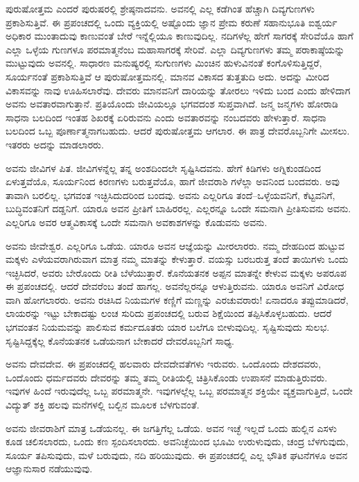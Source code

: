ಪುರುಷೋತ್ತಮ ಎಂದರೆ ಪುರುಷರಲ್ಲಿ ಶ್ರೇಷ್ಠನಾದವನು. ಅವನಲ್ಲಿ ಎಲ್ಲ ಕಡೆಗಿಂತ ಹೆಚ್ಚಾಗಿ ದಿವ್ಯಗುಣಗಳು ಪ್ರಕಾಶಿಸುತ್ತಿವೆ. ಈ ಪ್ರಪಂಚದಲ್ಲಿ ಒಂದು ವ್ಯಕ್ತಿಯಲ್ಲಿ ಅಷ್ಟೊಂದು ಜ್ಞಾನ ಪ್ರೇಮ ಕರುಣೆ ಸಹಾನುಭೂತಿ ಐಶ್ವರ್ಯ ಅಧಿಕಾರ ಮುಂತಾದುವು ಕಾಣುವಂತೆ ಬೇರೆ ಇನ್ನೆಲ್ಲಿಯೂ ಕಾಣುವುದಿಲ್ಲ. ನದಿಗಳೆಲ್ಲ ಹೇಗೆ ಸಾಗರಕ್ಕೆ ಸೇರಿವೆಯೊ ಹಾಗೆ ಎಲ್ಲಾ ಒಳ್ಳೆಯ ಗುಣಗಳೂ ಪರಮಾತ್ಮನೆಂಬ ಮಹಾಸಾಗರಕ್ಕೆ ಸೇರಿವೆ. ಎಲ್ಲಾ ದಿವ್ಯಗುಣಗಳು ತಮ್ಮ ಪರಾಕಾಷ್ಠೆಯನ್ನು ಮುಟ್ಟುವುದು ಅವನಲ್ಲಿ. ಸಾಧಾರಣ ಮನುಷ್ಯರಲ್ಲಿ ಸುಗುಣಗಳು ಮಿಂಚಿನ ಹುಳುವಿನಂತೆ ಕಂಗೊಳಿಸುತ್ತಿದ್ದರೆ, ಸೂರ್ಯನಂತೆ ಪ್ರಕಾಶಿಸುತ್ತಿವೆ ಆ ಪುರುಷೋತ್ತಮನಲ್ಲಿ. ಮಾನವ ವಿಕಾಸದ ತುತ್ತತುದಿ ಅದು. ಅದನ್ನು ಮೀರಿದ ವಿಕಾಸವನ್ನು ನಾವು ಊಹಿಸಲಾರೆವು. ದೇವರು ಮಾನವನಿಗೆ ದಾರಿಯನ್ನು ತೋರಲು ಇಳಿದು ಬಂದ ಎಂದು ಹೇಳಿದಾಗ ಅವನು ಅವತಾರವಾಗುತ್ತಾನೆ. ಪ್ರತಿಯೊಂದು ಜೀವಿಯಲ್ಲೂ ಭಗವದಂಶ ಸುಪ್ತವಾಗಿದೆ. ಜನ್ಮ ಜನ್ಮಗಳು ಹೋರಾಡಿ ಸಾಧನಾ ಬಲದಿಂದ ಇಂತಹ ಶಿಖರಕ್ಕೆ ಏರಿರುವನು ಎಂದು ಅವತಾರವನ್ನು ನಂಬದವರು ಹೇಳುತ್ತಾರೆ. ಸಾಧನಾ ಬಲದಿಂದ ಒಬ್ಬ ಪೂರ್ಣಾತ್ಮನಾಗಬಹುದು. ಆದರೆ ಪುರುಷೋತ್ತಮ ಆಗಲಾರ. ಈ ಪಾತ್ರ ದೇವರೊಬ್ಬನಿಗೇ ಮೀಸಲು. ಇತರರು ಅದನ್ನು ಮಾಡಲಾರರು.

ಅವನು ಜೀವಿಗಳ ಪಿತ. ಜೀವಿಗಳನ್ನೆಲ್ಲ ತನ್ನ ಅಂಶದಿಂದಲೇ ಸೃಷ್ಟಿಸಿದವನು. ಹೇಗೆ ಕಿಡಿಗಳು ಅಗ್ನಿಕುಂಡದಿಂದ ಏಳುತ್ತವೆಯೊ, ಸೂರ್ಯನಿಂದ ಕಿರಣಗಳು ಬರುತ್ತವೆಯೊ, ಹಾಗೆ ಜೀವರಾಶಿ ಗಳೆಲ್ಲಾ ಅವನಿಂದ ಬಂದವರು. ಅವು ತಾವಾಗಿ ಬರಲಿಲ್ಲ. ಭಗವಂತ ಇಚ್ಛಿಸಿದುದರಿಂದ ಬಂದವು. ಅವನು ಎಲ್ಲರಿಗೂ ತಂದೆ–ಒಳ್ಳೆಯವನಿಗೆ, ಕೆಟ್ಟವನಿಗೆ, ಬುದ್ಧಿವಂತನಿಗೆ ದಡ್ಡನಿಗೆ. ಯಾರೂ ಅವನ ಪ್ರೀತಿಗೆ ಬಾಹಿರರಲ್ಲ. ಎಲ್ಲರನ್ನೂ ಒಂದೇ ಸಮನಾಗಿ ಪ್ರೀತಿಸುವನು ಅವನು. ಎಲ್ಲರಿಗೂ ಅವರ ಆತ್ಮವಿಕಾಸಕ್ಕೆ ಒಂದೇ ಸಮನಾಗಿ ಅವಕಾಶಗಳನ್ನು ಕೊಡುವನು ಅವನು.

ಅವನು ಜೀವೇಶ್ವರ. ಎಲ್ಲರಿಗೂ ಒಡೆಯ. ಯಾರೂ ಅವನ ಆಜ್ಞೆಯನ್ನು ಮೀರಲಾರರು. ನಮ್ಮ ದೇಹದಿಂದ ಹುಟ್ಟುವ ಮಕ್ಕಳು ಎಳೆಯವರಾಗಿರುವಾಗ ಮಾತ್ರ ನಮ್ಮ ಮಾತನ್ನು ಕೇಳುತ್ತಾರೆ. ವಯಸ್ಸು ಬರಬರುತ್ತ ತಂದೆ ತಾಯಿಗಳು ಒಂದು ಇಚ್ಛಿಸಿದರೆ, ಅವರು ಬೇರೊಂದು ರೀತಿ ಬೆಳೆಯುತ್ತಾರೆ. ಕೊನೆಯತನಕ ಅಪ್ಪನ ಮಾತನ್ನೇ ಕೇಳುವ ಮಕ್ಕಳು ಅಪರೂಪ ಈ ಪ್ರಪಂಚದಲ್ಲಿ. ಆದರೆ ದೇವರೆಂಬ ತಂದೆ ಹಾಗಲ್ಲ. ಅವನೆಲ್ಲರನ್ನೂ ಆಳುತ್ತಿರುವನು. ಯಾರೂ ಅವನಿಗೆ ವಿರೋಧ ವಾಗಿ ಹೋಗಲಾರರು. ಅವನು ರಚಿಸಿದ ನಿಯಮಗಳ ಕಣ್ಣಿಗೆ ಮಣ್ಣನ್ನು ಎರಚುವರಾರು! ಏನಾದರೂ ತಪ್ಪುಮಾಡಿದರೆ, ಲಾಯರನ್ನು ಇಟ್ಟು ಬೇಕಾದಷ್ಟು ಲಂಚ ಸುರಿದು ಪ್ರಪಂಚದಲ್ಲಿ ಬರುವ ಶಿಕ್ಷೆಯಿಂದ ತಪ್ಪಿಸಿಕೊಳ್ಳಬಹುದು. ಆದರೆ ಭಗವಂತನ ನಿಯಮವನ್ನು ಪಾಲಿಸುವ ಕರ್ಮದೂತರು ಯಾರ ಬಲೆಗೂ ಬೀಳುವುದಿಲ್ಲ. ಸೃಷ್ಟಿಸುವುದು ಸುಲಭ. ಸೃಷ್ಟಿಸಿದ್ದಕ್ಕೆಲ್ಲ ಕೊನೆಯತನಕ ಒಡೆಯನಾಗ ಬೇಕಾದರೆ ದೇವರೊಬ್ಬನಿಗೆ ಸಾಧ್ಯ.

ಅವನು ದೇವದೇವ. ಈ ಪ್ರಪಂಚದಲ್ಲಿ ಹಲವಾರು ದೇವದೇವತೆಗಳು ಇರುವರು. ಒಂದೊಂದು ದೇಶದವರು, ಒಂದೊಂದು ಧರ್ಮದವರು ದೇವರನ್ನು ತಮ್ಮ ತಮ್ಮ ರೀತಿಯಲ್ಲಿ ಚಿತ್ರಿಸಿಕೊಂಡು ಉಪಾಸನೆ ಮಾಡುತ್ತಿರುವರು. ಇವುಗಳ ಹಿಂದೆ ಇರುವುದೆಲ್ಲ ಒಬ್ಬ ಪರಮಾತ್ಮನೇ. ಇವುಗಳಲ್ಲೆಲ್ಲ ಒಬ್ಬ ಪರಮಾತ್ಮನ ಶಕ್ತಿಯೇ ವ್ಯಕ್ತವಾಗುತ್ತಿದೆ, ಒಂದೇ ವಿದ್ಯುತ್ ಶಕ್ತಿ ಹಲವು ಮನೆಗಳಲ್ಲಿ ಬಲ್ಬಿನ ಮೂಲಕ ಬೆಳಗುವಂತೆ.

ಅವನು ಜೀವರಾಶಿಗೆ ಮಾತ್ರ ಒಡೆಯನಲ್ಲ. ಈ ಜಗತ್ತಿಗೆಲ್ಲ ಒಡೆಯ. ಅವನ ಇಚ್ಛೆ ಇಲ್ಲದೆ ಒಂದು ಹುಲ್ಲಿನ ಎಸಳು ಕೂಡ ಚಲಿಸಲಾರದು, ಒಂದು ಕಣ ಸ್ಪಂದಿಸಲಾರದು. ಅವನಿಚ್ಛೆಯಿಂದ ಭೂಮಿ ಉರುಳುವುದು, ಚಂದ್ರ ಬೆಳಗುವುದು, ಸೂರ್ಯ ತಪಿಸುವುದು, ಮಳೆ ಬರುವುದು, ನದಿ ಹರಿಯುವುದು. ಈ ಪ್ರಪಂಚದಲ್ಲಿ ಎಲ್ಲ ಭೌತಿಕ ಘಟನೆಗಳೂ ಅವನ ಆಜ್ಞಾನುಸಾರ ನಡೆಯುವುವು.

